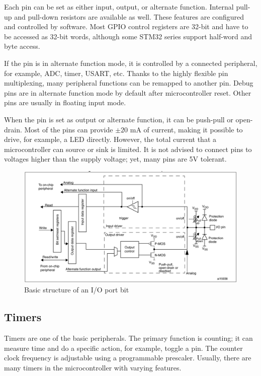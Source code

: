 Each pin can be set as either input, output, or alternate function. Internal pull-up and pull-down resistors are available as well. These features are configured and controlled by software. Most GPIO control registers are 32-bit and have to be accessed as 32-bit words, although some STM32 series support half-word and byte access.

If the pin is in alternate function mode, it is controlled by a connected peripheral, for example, ADC, timer, USART, etc. Thanks to the highly flexible pin multiplexing, many peripheral functions can be remapped to another pin. Debug pins are in alternate function mode by default after microcontroller reset. Other pins are usually in floating input mode.

When the pin is set as output or alternate function, it can be push-pull or open-drain. Most of the pins can provide $\pm20 \text{ mA}$ of current, making it possible to drive, for example, a LED directly. However, the total current that a microcontroller can source or sink is limited. It is not advised to connect pins to voltages higher than the supply voltage; yet, many pins are 5V tolerant.
\begin{figure}
\centering
\includegraphics[width=0.9\linewidth]{support/pic/io_port.png}
\caption{Basic structure of an I/O port bit \cite{f303_ref}} %
\label{fig:gpio}
\end{figure}

	\subsection{Timers}
	\label{sub:timers}
Timers are one of the basic peripherals. The primary function is counting; it can measure time and do a specific action, for example, toggle a pin. The counter clock frequency is adjustable using a programmable prescaler. Usually, there are many timers in the microcontroller with varying features.

